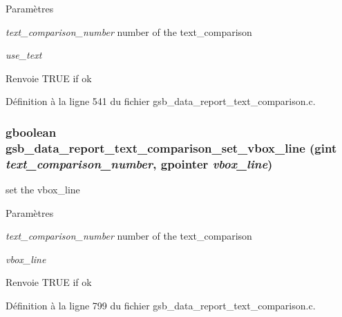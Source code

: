 \begin{DoxyParams}{Paramètres}
\item[{\em text\_\-comparison\_\-number}]number of the text\_\-comparison \item[{\em use\_\-text}]\end{DoxyParams}
\begin{DoxyReturn}{Renvoie}
TRUE if ok 
\end{DoxyReturn}


Définition à la ligne 541 du fichier gsb\_\-data\_\-report\_\-text\_\-comparison.c.

\subsubsection[{gsb\_\-data\_\-report\_\-text\_\-comparison\_\-set\_\-vbox\_\-line}]{\setlength{\rightskip}{0pt plus 5cm}gboolean gsb\_\-data\_\-report\_\-text\_\-comparison\_\-set\_\-vbox\_\-line (gint {\em text\_\-comparison\_\-number}, \/  gpointer {\em vbox\_\-line})}\label{gsb__data__report__text__comparison_8h_a748d2dc15458afe5a479bdc81082ecab}
set the vbox\_\-line


\begin{DoxyParams}{Paramètres}
\item[{\em text\_\-comparison\_\-number}]number of the text\_\-comparison \item[{\em vbox\_\-line}]\end{DoxyParams}
\begin{DoxyReturn}{Renvoie}
TRUE if ok 
\end{DoxyReturn}


Définition à la ligne 799 du fichier gsb\_\-data\_\-report\_\-text\_\-comparison.c.

